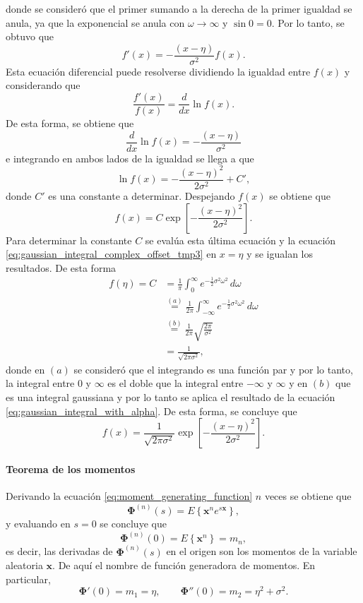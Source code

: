 \documentclass[a4paper]{report}
\newcommand{\x}{\mathbf{x}}
\newcommand{\Phibf}{\mathbf{\Phi}}
\begin{document}
donde se consideró que el primer sumando a la derecha de la primer igualdad se anula, ya que la exponencial se anula con \(\omega\to\infty\) y \(\sin0=0\). Por lo tanto, se obtuvo que
\[
 f'(x)=-\frac{(x-\eta)}{\sigma^2}f(x).
\]
Esta ecuación diferencial puede resolverse dividiendo la igualdad entre \(f(x)\) y considerando que
\[
 \frac{f'(x)}{f(x)}=\frac{d}{dx}\ln f(x).
\]
De esta forma, se obtiene que
\[
 \frac{d}{dx}\ln f(x)=-\frac{(x-\eta)}{\sigma^2}
\]
e integrando en ambos lados de la igualdad se llega a que
\[
 \ln f(x)=-\frac{(x-\eta)^2}{2\sigma^2}+C',
\]
donde \(C'\) es una constante a determinar. Despejando \(f(x)\) se obtiene que
\[
 f(x)=C\exp\left[-\frac{(x-\eta)^2}{2\sigma^2}\right].
\]
Para determinar la constante \(C\) se evalúa esta última ecuación y la ecuación \ref{eq:gaussian_integral_complex_offset_tmp3} en \(x=\eta\) y se igualan los resultados. De esta forma
\begin{align*}
 f(\eta)=C&=\frac{1}{\pi}\int_{0}^{\infty}e^{-\frac{1}{2}\sigma^2\omega^2}\,d\omega\\
   &\overset{(a)}{=}\frac{1}{2\pi}\int_{-\infty}^{\infty}e^{-\frac{1}{2}\sigma^2\omega^2}\,d\omega\\
   &\overset{(b)}{=}\frac{1}{2\pi}\sqrt{\frac{2\pi}{\sigma^2}}\\
   &=\frac{1}{\sqrt{2\pi\sigma^2}},
\end{align*}
donde en \((a)\) se consideró que el integrando es una función par y por lo tanto, la integral entre 0 y \(\infty\) es el doble que la integral entre \(-\infty\) y \(\infty\) y en \((b)\) que es una integral gaussiana y por lo tanto se aplica el resultado de la ecuación \ref{eq:gaussian_integral_with_alpha}. De esta forma, se concluye que
\[
 f(x)=\frac{1}{\sqrt{2\pi\sigma^2}}\exp\left[-\frac{(x-\eta)^2}{2\sigma^2}\right].
\]

\paragraph{Teorema de los momentos} Derivando la ecuación \ref{eq:moment_generating_function} \(n\) veces se obtiene que
\[
 \Phibf^{(n)}(s)=E\left\{\x^ne^{s\x}\right\},
\]
y evaluando en \(s=0\) se concluye que
\begin{equation}\label{eq:moments_theorem}
 \Phibf^{(n)}(0)=E\left\{\x^n\right\}=m_n,
\end{equation}
es decir, las derivadas de \(\Phibf^{(n)}(s)\) en el origen son los momentos de la variable aleatoria \(\x\). De aquí el nombre de función generadora de momentos. En particular,
\[
 \Phibf'(0)=m_1=\eta,\qquad\Phibf''(0)=m_2=\eta^2+\sigma^2.
\]
\end{document}
